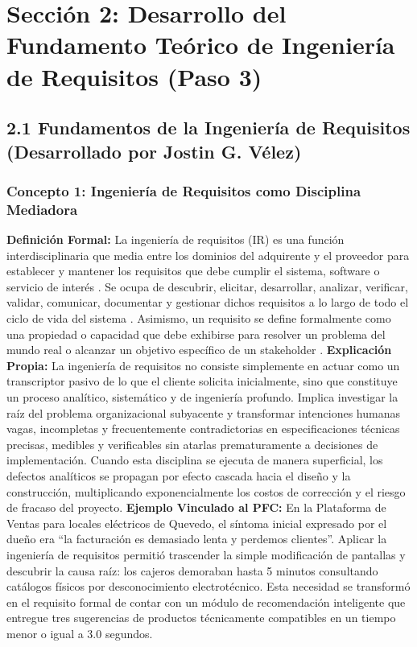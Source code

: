 	\section{Sección 2: Desarrollo del Fundamento Teórico de Ingeniería de Requisitos (Paso 3)}
\subsection{2.1 Fundamentos de la Ingeniería de Requisitos (Desarrollado por Jostin G. Vélez)}
\subsubsection{Concepto 1: Ingeniería de Requisitos como Disciplina Mediadora}
\textbf{Definición Formal:} La ingeniería de requisitos (IR) es una función interdisciplinaria que media entre los dominios del adquirente y el proveedor para establecer y mantener los requisitos que debe cumplir el sistema, software o servicio de interés \cite{ieee29148}. Se ocupa de descubrir, elicitar, desarrollar, analizar, verificar, validar, comunicar, documentar y gestionar dichos requisitos a lo largo de todo el ciclo de vida del sistema \cite{ieee29148, ieee15288}. Asimismo, un requisito se define formalmente como una propiedad o capacidad que debe exhibirse para resolver un problema del mundo real o alcanzar un objetivo específico de un stakeholder \cite{pohl2025, swebok2024}.
\textbf{Explicación Propia:} La ingeniería de requisitos no consiste simplemente en actuar como un transcriptor pasivo de lo que el cliente solicita inicialmente, sino que constituye un proceso analítico, sistemático y de ingeniería profundo. Implica investigar la raíz del problema organizacional subyacente y transformar intenciones humanas vagas, incompletas y frecuentemente contradictorias en especificaciones técnicas precisas, medibles y verificables sin atarlas prematuramente a decisiones de implementación. Cuando esta disciplina se ejecuta de manera superficial, los defectos analíticos se propagan por efecto cascada hacia el diseño y la construcción, multiplicando exponencialmente los costos de corrección y el riesgo de fracaso del proyecto.
\textbf{Ejemplo Vinculado al PFC:} En la Plataforma de Ventas para locales eléctricos de Quevedo, el síntoma inicial expresado por el dueño era ``la facturación es demasiado lenta y perdemos clientes''. Aplicar la ingeniería de requisitos permitió trascender la simple modificación de pantallas y descubrir la causa raíz: los cajeros demoraban hasta 5 minutos consultando catálogos físicos por desconocimiento electrotécnico. Esta necesidad se transformó en el requisito formal de contar con un módulo de recomendación inteligente que entregue tres sugerencias de productos técnicamente compatibles en un tiempo menor o igual a 3.0 segundos.
